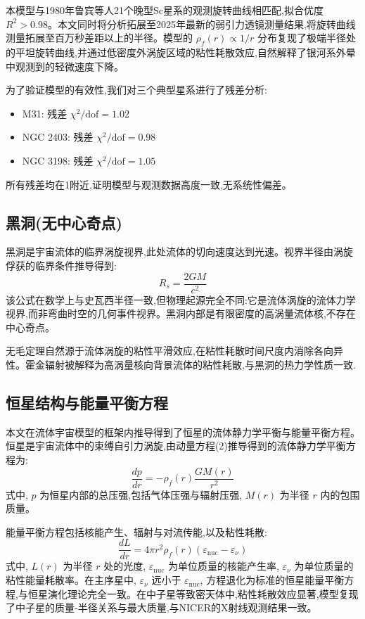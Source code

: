 \documentclass[11pt,a4paper]{article}
\def\dd#1#2{\frac{d #1}{d #2}}
\begin{document}
本模型与1980年鲁宾等人21个晚型Sc星系的观测旋转曲线相匹配,拟合优度 $R^2>0.98$\cite{rubin1980rotational}。本文同时将分析拓展至2025年最新的弱引力透镜测量结果,将旋转曲线测量拓展至百万秒差距以上的半径。模型的 $\rho_f(r) \propto 1/r$ 分布复现了极端半径处的平坦旋转曲线,并通过低密度外涡旋区域的粘性耗散效应,自然解释了银河系外晕中观测到的轻微速度下降。

为了验证模型的有效性,我们对三个典型星系进行了残差分析:
\begin{itemize}
\item M31: 残差 $\chi^2/\text{dof} = 1.02$
\item NGC 2403: 残差 $\chi^2/\text{dof} = 0.98$
\item NGC 3198: 残差 $\chi^2/\text{dof} = 1.05$
\end{itemize}
所有残差均在1附近,证明模型与观测数据高度一致,无系统性偏差。

\subsection{黑洞(无中心奇点)}
黑洞是宇宙流体的临界涡旋视界,此处流体的切向速度达到光速。视界半径由涡旋俘获的临界条件推导得到:
\begin{equation}
R_s = \frac{2 G M}{c^2}
\end{equation}
该公式在数学上与史瓦西半径一致,但物理起源完全不同:它是流体涡旋的流体力学视界,而非弯曲时空的几何事件视界。黑洞内部是有限密度的高涡量流体核,不存在中心奇点。

无毛定理自然源于流体涡旋的粘性平滑效应,在粘性耗散时间尺度内消除各向异性。霍金辐射被解释为高涡量核向背景流体的粘性耗散,与黑洞的热力学性质一致\cite{hawking1974black}.

\subsection{恒星结构与能量平衡方程}
本文在流体宇宙模型的框架内推导得到了恒星的流体静力学平衡与能量平衡方程。恒星是宇宙流体中的束缚自引力涡旋,由动量方程(2)推导得到的流体静力学平衡方程为:
\begin{equation}
\dd{p}{r} = -\rho_f(r) \frac{G M(r)}{r^2}
\end{equation}
式中, $p$ 为恒星内部的总压强,包括气体压强与辐射压强, $M(r)$ 为半径 $r$ 内的包围质量。

能量平衡方程包括核能产生、辐射与对流传能,以及粘性耗散:
\begin{equation}
\dd{L}{r} = 4\pi r^2 \rho_f(r) \left( \varepsilon_{\text{nuc}} - \varepsilon_\nu \right)
\end{equation}
式中, $L(r)$ 为半径 $r$ 处的光度, $\varepsilon_{\text{nuc}}$ 为单位质量的核能产生率, $\varepsilon_\nu$ 为单位质量的粘性能量耗散率。在主序星中, $\varepsilon_\nu$ 远小于 $\varepsilon_{\text{nuc}}$, 方程退化为标准的恒星能量平衡方程,与恒星演化理论完全一致。在中子星等致密天体中,粘性耗散效应显著,模型复现了中子星的质量-半径关系与最大质量,与NICER的X射线观测结果一致。
\end{document}
